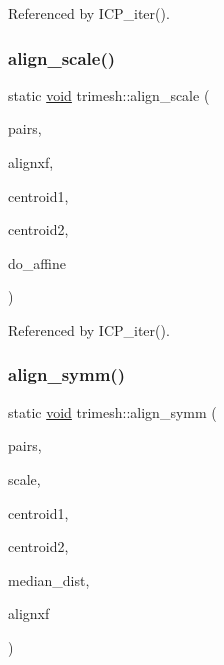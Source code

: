 Referenced by I\+C\+P\+\_\+iter().

\mbox{\label{namespacetrimesh_a4623940ecf4915dd04c99789847b016e}} 
\subsubsection{\texorpdfstring{align\+\_\+scale()}{align\_scale()}}
{\footnotesize\ttfamily static \hyperlink{namespacetrimesh_a784ddfd979e1c579bda795a8edfc3f43}{void} trimesh\+::align\+\_\+scale (\begin{DoxyParamCaption}\item[{const vector$<$ \hyperlink{structtrimesh_1_1PtPair}{Pt\+Pair} $>$ \&}]{pairs,  }\item[{\hyperlink{namespacetrimesh_ad504958f2f56e393991b848986a8459f}{xform} \&}]{alignxf,  }\item[{const \hyperlink{namespacetrimesh_a325b99fd6454b22fa4c4bc3223271b2c}{point} \&}]{centroid1,  }\item[{const \hyperlink{namespacetrimesh_a325b99fd6454b22fa4c4bc3223271b2c}{point} \&}]{centroid2,  }\item[{bool}]{do\+\_\+affine }\end{DoxyParamCaption})\hspace{0.3cm}{\ttfamily [static]}}



Referenced by I\+C\+P\+\_\+iter().

\mbox{\label{namespacetrimesh_a3ee9ec7e4e2421ba6ef8913368472591}} 
\subsubsection{\texorpdfstring{align\+\_\+symm()}{align\_symm()}}
{\footnotesize\ttfamily static \hyperlink{namespacetrimesh_a784ddfd979e1c579bda795a8edfc3f43}{void} trimesh\+::align\+\_\+symm (\begin{DoxyParamCaption}\item[{const vector$<$ \hyperlink{structtrimesh_1_1PtPair}{Pt\+Pair} $>$ \&}]{pairs,  }\item[{float}]{scale,  }\item[{const \hyperlink{namespacetrimesh_a325b99fd6454b22fa4c4bc3223271b2c}{point} \&}]{centroid1,  }\item[{const \hyperlink{namespacetrimesh_a325b99fd6454b22fa4c4bc3223271b2c}{point} \&}]{centroid2,  }\item[{float}]{median\+\_\+dist,  }\item[{\hyperlink{namespacetrimesh_ad504958f2f56e393991b848986a8459f}{xform} \&}]{alignxf }\end{DoxyParamCaption})\hspace{0.3cm}{\ttfamily [static]}}




